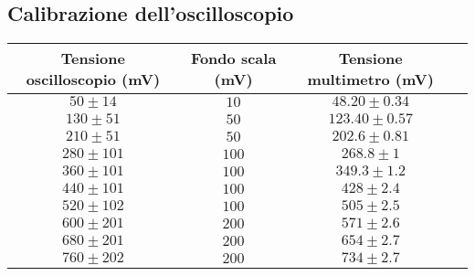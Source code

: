 \documentclass[]{article}
\begin{document}
\subsection{Calibrazione dell'oscilloscopio}
\begin{center}
	\begin{tabular}{|c|c|c|c|}
		\hline
		Tensione oscilloscopio (mV)& Fondo scala (mV) & Tensione multimetro (mV) \\
		\hline
		$ 50\pm 14 $ &$ 10 $ & $ 48.20\pm 0.34 $ \\
		\hline
		$ 130\pm51 $ &$ 50 $ & $ 123.40\pm 0.57 $ \\
		\hline
		$ 210\pm 51 $ &$ 50 $ & $ 202.6\pm 0.81 $ \\
		\hline
		$ 280\pm 101 $ &$ 100 $ & $ 268.8\pm 1 $ \\
		\hline
		$ 360\pm 101 $ &$ 100 $ & $ 349.3\pm 1.2 $ \\
		\hline
		$ 440\pm 101 $ &$ 100 $ & $ 428\pm 2.4 $ \\
		\hline
		$ 520\pm 102 $ &$ 100 $ & $ 505\pm 2.5 $ \\
		\hline
		$ 600\pm 201 $ &$ 200 $ & $ 571\pm 2.6 $ \\
		\hline
		$ 680\pm 201 $ &$ 200 $ & $ 654\pm 2.7 $ \\
		\hline
		$ 760\pm 202 $ &$ 200 $ & $ 734\pm 2.7 $ \\
		\hline
	\end{tabular}
\end{center}
\end{document}
